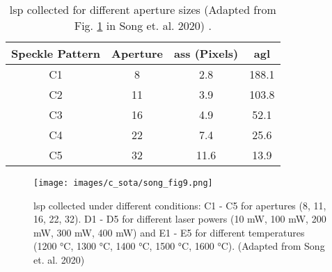     \begin{table}[h]
        \centering
        \footnotesize
        \renewcommand{\arraystretch}{1.2}
        \begin{tabular}{cccc}
            \toprule
            \textbf{Speckle Pattern} & \textbf{Aperture} & \textbf{\gls{ass} (Pixels)} & \textbf{\gls{agl}} \\
            \midrule
            
            C1 & 8 & 2.8 & 188.1 \\
            C2 & 11 & 3.9 & 103.8 \\
            C3 & 16 & 4.9 & 52.1 \\
            C4 & 22 & 7.4 & 25.6 \\
            C5 & 32 & 11.6 & 13.9 \\
    
            \bottomrule
        \end{tabular}
        \caption{\gls{lsp} collected for different aperture sizes (Adapted from Fig. \ref{fig:song_fig9} in Song et. al. 2020) \cite{song}.}
        \label{table:song_table_c}
    \end{table}

    \begin{figure}[h]
        \centering
        \texttt{[image: images/c\_sota/song\_fig9.png]}
        \caption{\gls{lsp} collected under different conditions: C1 - C5 for apertures (8, 11, 16, 22, 32). D1 - D5 for different laser powers (10 mW, 100 mW, 200 mW, 300 mW, 400 mW) and E1 - E5 for different temperatures (1200 °C, 1300 °C, 1400 °C, 1500 °C, 1600 °C). (Adapted from Song et. al. 2020) \cite{song}}
        \label{fig:song_fig9}
    \end{figure} 


    
